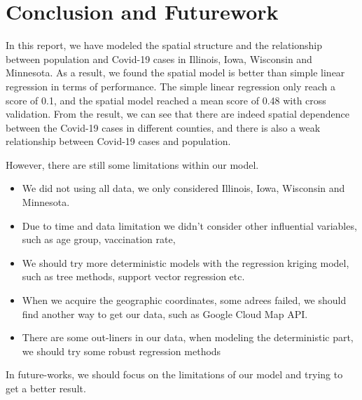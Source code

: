\documentclass{article}
\begin{document}
\section{Conclusion and Futurework}
In this report, we have modeled the spatial structure and the relationship between population and Covid-19 cases in Illinois, Iowa, Wisconsin and Minnesota. As a result, we found the spatial model is better than simple linear regression in terms of performance. The simple linear regression only reach a score of 0.1, and the spatial model reached a mean score of 0.48 with cross validation. From the result, we can see that there are indeed spatial dependence between the Covid-19 cases in different counties, and there is also a weak relationship between Covid-19 cases and population. 

However, there are still some limitations within our model. 
\begin{itemize}
    \item We did not using all data, we only considered Illinois, Iowa, Wisconsin and Minnesota.
    \item Due to time and data limitation we didn't consider other influential variables, such as age group, vaccination rate, 
    \item We should try more deterministic models with the regression kriging model, such as tree methods, support vector regression etc.
    \item When we acquire the geographic coordinates, some adrees  failed, we should find another way to get our data, such as Google Cloud Map API. 
    \item There are some out-liners in our data, when modeling the deterministic part, we should try some robust regression methods
\end{itemize}
In future-works, we should focus on the limitations of our model and trying to get a better result.  





\end{document}
